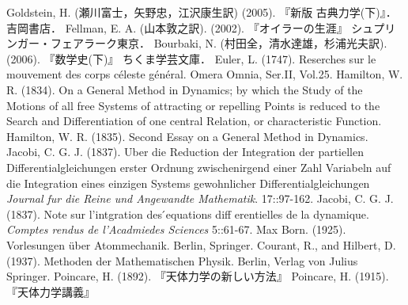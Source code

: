 \documentclass[uplatex, dvipdfmx]{jsarticle}
\begin{document}
\begin{thebibliography}{99}
    Goldstein, H. (瀬川富士，矢野忠，江沢康生訳) (2005). 『新版 古典力学(下)』．吉岡書店．
    Fellman, E. A. (山本敦之訳). (2002). 『オイラーの生涯』 シュプリンガー・フェアラーク東京．
    Bourbaki, N. (村田全，清水達雄，杉浦光夫訳). (2006). 『数学史(下)』 ちくま学芸文庫．
    Euler, L. (1747). Reserches sur le mouvement des corps céleste général. Omera Omnia, Ser.II, Vol.25.
    Hamilton, W. R. (1834). On a General Method in Dynamics; by which the Study of the Motions of all
    free Systems of attracting or repelling Points is reduced to the Search and Differentiation
    of one central Relation, or characteristic Function.
    Hamilton, W. R. (1835). Second Essay on a General Method in Dynamics.
    Jacobi, C. G. J. (1837). Uber die Reduction der Integration der partiellen Differentialgleichungen erster Ordnung zwischenirgend einer Zahl Variabeln auf die Integration eines einzigen Systems gewohnlicher Differentialgleichungen \textit{Journal fur die Reine und Angewandte Mathematik}. 17::97-162.
    Jacobi, C. G. J. (1837). Note sur l’intgration des ́equations diff erentielles de la dynamique. \textit{Comptes rendus de l’Acadmiedes Sciences} 5::61-67.
    Max Born. (1925). Vorlesungen über Atommechanik. Berlin, Springer.
    Courant, R., and Hilbert, D. (1937). Methoden der Mathematischen Physik. Berlin, Verlag von Julius Springer.
    Poincare, H. (1892). 『天体力学の新しい方法』
    Poincare, H. (1915). 『天体力学講義』
\end{thebibliography}
\end{document}
